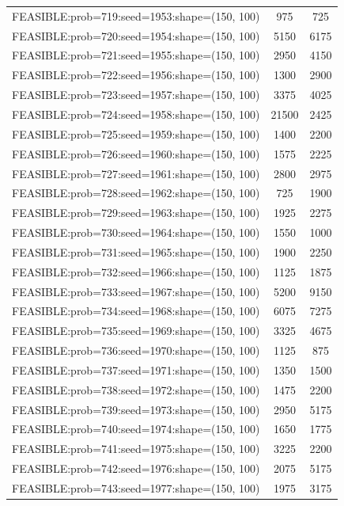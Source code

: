 \begin{longtable}{lcc}
FEASIBLE:prob=719:seed=1953:shape=(150, 100) &      975 &   725 \\
FEASIBLE:prob=720:seed=1954:shape=(150, 100) &     5150 &  6175 \\
FEASIBLE:prob=721:seed=1955:shape=(150, 100) &     2950 &  4150 \\
FEASIBLE:prob=722:seed=1956:shape=(150, 100) &     1300 &  2900 \\
FEASIBLE:prob=723:seed=1957:shape=(150, 100) &     3375 &  4025 \\
FEASIBLE:prob=724:seed=1958:shape=(150, 100) &    21500 &  2425 \\
FEASIBLE:prob=725:seed=1959:shape=(150, 100) &     1400 &  2200 \\
FEASIBLE:prob=726:seed=1960:shape=(150, 100) &     1575 &  2225 \\
FEASIBLE:prob=727:seed=1961:shape=(150, 100) &     2800 &  2975 \\
FEASIBLE:prob=728:seed=1962:shape=(150, 100) &      725 &  1900 \\
FEASIBLE:prob=729:seed=1963:shape=(150, 100) &     1925 &  2275 \\
FEASIBLE:prob=730:seed=1964:shape=(150, 100) &     1550 &  1000 \\
FEASIBLE:prob=731:seed=1965:shape=(150, 100) &     1900 &  2250 \\
FEASIBLE:prob=732:seed=1966:shape=(150, 100) &     1125 &  1875 \\
FEASIBLE:prob=733:seed=1967:shape=(150, 100) &     5200 &  9150 \\
FEASIBLE:prob=734:seed=1968:shape=(150, 100) &     6075 &  7275 \\
FEASIBLE:prob=735:seed=1969:shape=(150, 100) &     3325 &  4675 \\
FEASIBLE:prob=736:seed=1970:shape=(150, 100) &     1125 &   875 \\
FEASIBLE:prob=737:seed=1971:shape=(150, 100) &     1350 &  1500 \\
FEASIBLE:prob=738:seed=1972:shape=(150, 100) &     1475 &  2200 \\
FEASIBLE:prob=739:seed=1973:shape=(150, 100) &     2950 &  5175 \\
FEASIBLE:prob=740:seed=1974:shape=(150, 100) &     1650 &  1775 \\
FEASIBLE:prob=741:seed=1975:shape=(150, 100) &     3225 &  2200 \\
FEASIBLE:prob=742:seed=1976:shape=(150, 100) &     2075 &  5175 \\
FEASIBLE:prob=743:seed=1977:shape=(150, 100) &     1975 &  3175 \\

\end{longtable}
